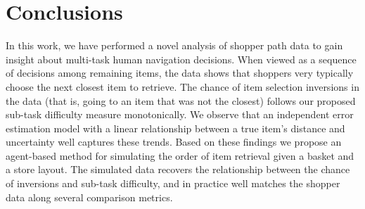 \documentclass[aps,pre,twocolumn,groupedaddress]{revtex4-2}
\begin{document}
\section{Conclusions\label{conclusions}}
In this work, we have performed a novel analysis of shopper path data to gain insight about multi-task human navigation decisions. When viewed as a sequence of decisions among remaining items, the data shows that shoppers very typically choose the next closest item to retrieve. The chance of item selection inversions in the data (that is, going to an item that was not the closest) follows our proposed sub-task difficulty measure monotonically. We observe that an independent error estimation model with a linear relationship between a true item's distance and uncertainty well captures these trends. Based on these findings we propose an agent-based method for simulating the order of item retrieval given a basket and a store layout. The simulated data recovers the relationship between the chance of inversions and sub-task difficulty, and in practice well matches the shopper data along several comparison metrics.
\vspace{1em}


%
\end{document}
